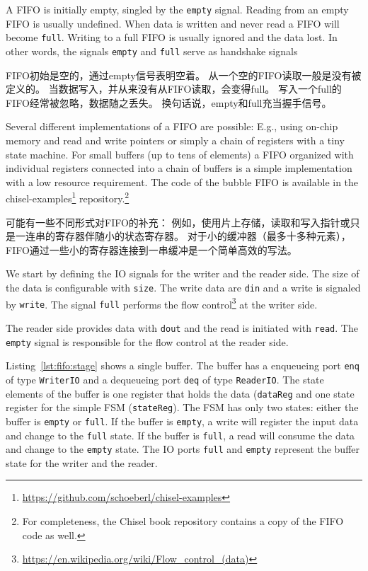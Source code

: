 \documentclass[%
    10pt,
    headinclude, footexclude,
    openright, %
    notitlepage,
    cleardoubleempty,
    headsepline,
    pointlessnumbers,
    bibtotoc, idxtotoc,
    ]{scrbook}
\newcommand{\code}[1]{{\small{\texttt{#1}}}}
\newcommand{\myref}[2]{\href{#1}{#2}}
\renewcommand{\myref}[2]{{#2}{\footnote{\url{#1}}}}
\begin{document}
A FIFO is initially empty, singled by the \code{empty} signal. Reading
from an empty FIFO is usually undefined. When data is written and never
read a FIFO will become \code{full}. Writing to a full FIFO is usually ignored
and the data lost. In other words, the signals \code{empty} and \code{full}
serve as handshake signals 

FIFO初始是空的，通过empty信号表明空着。
从一个空的FIFO读取一般是没有被定义的。
当数据写入，并从来没有从FIFO读取，会变得full。
写入一个full的FIFO经常被忽略，数据随之丢失。
换句话说，empty和full充当握手信号。

Several different implementations of a FIFO are possible: E.g., using on-chip
memory and read and write pointers or simply a chain of registers with a
tiny state machine. For small buffers (up to tens of elements) a FIFO organized
with individual registers connected into a chain of buffers is a simple
implementation with a low resource requirement.
The code of the bubble FIFO is available in the
\myref{https://github.com/schoeberl/chisel-examples}{chisel-examples}
repository.\footnote{For completeness, the Chisel book repository contains
a copy of the FIFO code as well.}

可能有一些不同形式对FIFO的补充：
例如，使用片上存储，读取和写入指针或只是一连串的寄存器伴随小的状态寄存器。
对于小的缓冲器（最多十多种元素）， FIFO通过一些小的寄存器连接到一串缓冲是一个简单高效的写法。

We start by defining the IO signals for the writer and the reader side.
The size of the data is configurable with \code{size}.
The write data are \code{din} and a write is signaled by \code{write}.
The signal \code{full} performs the
\myref{https://en.wikipedia.org/wiki/Flow_control_(data)}{flow control}
at the writer side.


The reader side provides data with \code{dout} and the read is initiated
with \code{read}. The \code{empty} signal is responsible for the flow control
at the reader side.


Listing~\ref{lst:fifo:stage} shows a single buffer. The buffer has a enqueueing port
\code{enq} of type \code{WriterIO} and a dequeueing port \code{deq} of type
\code{ReaderIO}. The state elements of the buffer is one register that holds the
data (\code{dataReg} and one state register for the simple FSM (\code{stateReg}).
The FSM has only two states: either the buffer is \code{empty} or \code{full}.
If the buffer is \code{empty}, a write will register the input data and change
to the \code{full} state.
If the buffer is \code{full}, a read will consume the data and change to the
\code{empty} state.
The IO ports \code{full} and \code{empty} represent the buffer state for
the writer and the reader.
\end{document}
